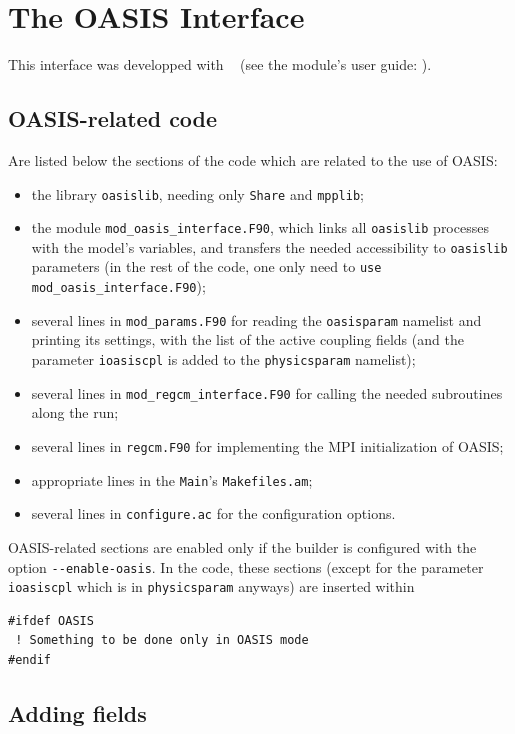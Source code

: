 \chapter{The OASIS Interface}

This interface was developped with \OA\ \citep{craig_2017} (see the module's
user guide:
\cite{valcke_oasis}).

\section{OASIS-related code}

Are listed below the sections of the code which are related to the use of OASIS:
\begin{itemize}
  \item the library \verb=oasislib=, needing only \verb=Share= and
        \verb=mpplib=;
  \item the module \verb=mod_oasis_interface.F90=, which links all
        \verb=oasislib= processes with the model's variables, and transfers the
        needed accessibility to \verb=oasislib= parameters (in the rest of the
        code, one only need to \verb=use mod_oasis_interface.F90=);
  \item several lines in \verb=mod_params.F90= for reading the \verb=oasisparam=
        namelist and printing its settings, with the list of the active
        coupling fields (and the parameter \verb=ioasiscpl= is added to the
        \verb=physicsparam= namelist);
  \item several lines in \verb=mod_regcm_interface.F90= for calling the needed
        subroutines along the run;
  \item several lines in \verb=regcm.F90= for implementing the MPI
        initialization of OASIS;
  \item appropriate lines in the \verb=Main='s \verb=Makefiles.am=;
  \item several lines in \verb=configure.ac= for the configuration options.
\end{itemize}

OASIS-related sections are enabled only if the builder is configured with the
option \verb=--enable-oasis=. In the code, these sections (except for the
parameter \verb=ioasiscpl= which is in \verb=physicsparam= anyways) are inserted
within
\begin{verbatim}
#ifdef OASIS
 ! Something to be done only in OASIS mode
#endif
\end{verbatim}

\section{Adding fields}

